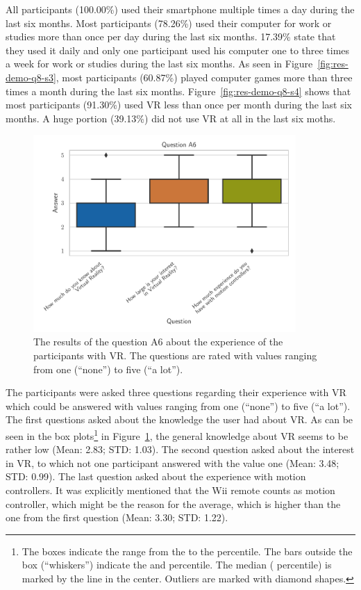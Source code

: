 All participants (100.00\%) used their smartphone multiple times a day during the last six months. Most participants (78.26\%) used their computer for work or studies more than once per day during the last six months. 17.39\% state that they used it daily and only one participant used his computer one to three times a week for work or studies during the last six months. As seen in Figure~\ref{fig:res-demo-q8-s3}, most participants (60.87\%) played computer games more than three times a month during the last six months. Figure~\ref{fig:res-demo-q8-s4} shows that most participants (91.30\%) used \ac{VR} less than once per month during the last six months. A huge portion (39.13\%) did not use \ac{VR} at all in the last six moths.

\begin{figure}[H]
  \centering
  \includegraphics[width=10cm]{figures/evaluation/res_demo_q9.pdf}
  \caption[VR experience of the participants]{The results of the question A6 about the experience of the participants with \ac{VR}. The questions are rated with values ranging from one (\enquote{none}) to five (\enquote{a lot}).}\label{fig:res-demo-q9}
\end{figure}

The participants were asked three questions regarding their experience with \ac{VR} which could be answered with values ranging from one (\enquote{none}) to five (\enquote{a lot}). The first questions asked about the knowledge the user had about \ac{VR}. As can be seen in the box plots\footnote{The boxes indicate the range from the  to the  percentile. The bars outside the box (\enquote{whiskers}) indicate the  and  percentile. The median ( percentile) is marked by the line in the center. Outliers are marked with diamond shapes.} in Figure~\ref{fig:res-demo-q9}, the general knowledge about \ac{VR} seems to be rather low (Mean: 2.83; \ac{STD}: 1.03). The second question asked about the interest in \ac{VR}, to which not one participant answered with the value one (Mean: 3.48; \ac{STD}: 0.99). The last question asked about the experience with motion controllers. It was explicitly mentioned that the Wii remote counts as motion controller, which might be the reason for the average, which is higher than the one from the first question (Mean: 3.30; \ac{STD}: 1.22).


